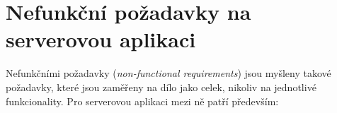 

\section{Nefunkční požadavky na serverovou aplikaci}
Nefunkčními požadavky (\textit{non-functional requirements}) jsou myšleny takové požadavky, které jsou zaměřeny na dílo jako celek, nikoliv na jednotlivé funkcionality. Pro serverovou aplikaci mezi ně patří především:

